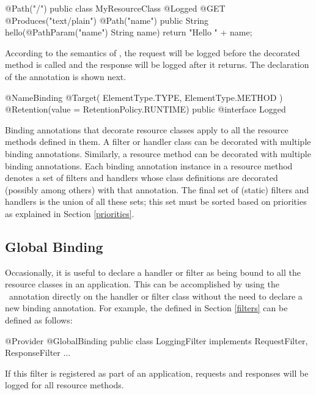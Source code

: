 \begin{listing}{1}
@Path("/")
public class MyResourceClass {
    @Logged
    @GET
    @Produces("text/plain")
    @Path("{name}")
    public String hello(@PathParam("name") String name) {
        return "Hello " + name;
    }
}
\end{listing}

According to the semantics of , the request will be logged before the decorated method is called and the response will be logged after it returns. The declaration of the  annotation is shown next.

\begin{listing}{1}
@NameBinding
@Target({ ElementType.TYPE, ElementType.METHOD })
@Retention(value = RetentionPolicy.RUNTIME)
public @interface Logged { }
\end{listing}

Binding annotations that decorate resource classes apply to all the resource methods defined in them. A filter or handler class can be decorated with multiple binding annotations. Similarly, a resource method can be decorated with multiple binding annotations.  Each binding annotation instance in a resource method denotes a set of filters and handlers whose class definitions are decorated (possibly among others) with that annotation. The final set of (static) filters and handlers is the union of all these sets; this set must be sorted based on priorities as explained in Section \ref{priorities}. 

\subsection{Global Binding}

Occasionally, it is useful to declare a handler or filter as being bound to all the resource classes in an application. This can be accomplished by using the \GlobalBinding\ annotation directly on the handler or filter class without the need to declare a new binding annotation. For example, the  defined in Section \ref{filters} can be defined as follows:

\begin{listing}{1}
@Provider
@GlobalBinding
public class LoggingFilter implements RequestFilter, ResponseFilter {
    ...
}
\end{listing}

If this filter is registered as part of an application, requests and responses will be logged for all resource methods. 

